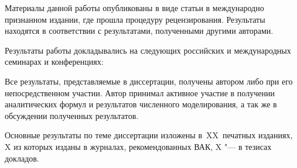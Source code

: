 {\reliability} Материалы данной работы опубликованы в виде статьи \cite{dokuchaevGENERALIZEDEINSTEINROSEN2024} в международно признанном издании,
где прошла процедуру рецензирования. Результаты находятся в соответствии с результатами, полученными другими авторами.

{\probation} Результаты работы докладывались на следующих российских и международных
семинарах и конференциях: 

{\contribution} Все результаты, представляемые в диссертации, получены автором либо при
его непосредственном участии. Автор принимал активное участие в получении аналитических формул и результатов численного моделирования, а так же в обсуждении полученных результатов.

{%
    {\publications} Основные результаты по теме диссертации изложены
    в~XX~печатных изданиях,
    X из которых изданы в журналах, рекомендованных ВАК,
    X "--- в тезисах докладов.
}%
